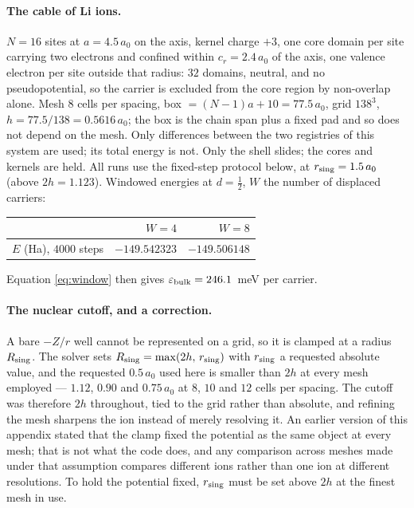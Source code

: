 \documentclass[11pt]{article}
\newcommand{\half}{\tfrac12}
\begin{document}
\paragraph{The cable of Li ions.} $N=16$ sites at $a=4.5\,a_0$ on the
axis, kernel charge $+3$, one core domain per site carrying two electrons and confined within
$c_r=2.4\,a_0$ of the axis, one valence electron per site outside that radius: $32$ domains, neutral,
and no pseudopotential, so the carrier is excluded from the core region by non-overlap alone. Mesh $8$ cells per spacing, box $=(N-1)a+10=77.5\,a_0$, grid $138^3$,
$h=77.5/138=0.5616\,a_0$; the box is the chain span plus a fixed pad and so does not depend on the
mesh. Only differences between the two registries of this system are used; its total energy is not.
Only the shell slides; the cores and kernels are held. All runs use the fixed-step protocol below,
at $r_{\rm sing}=1.5\,a_0$ (above $2h=1.123$). Windowed energies at $d=\half$, $W$ the number of
displaced carriers:
\begin{center}
\small
\begin{tabular}{@{}lrr@{}}
\toprule
 & $W=4$ & $W=8$\\
\midrule
$E$ (Ha), $4000$ steps & $-149.542323$ & $-149.506148$\\
\bottomrule
\end{tabular}
\end{center}
\noindent Equation \eqref{eq:window} then gives $\varepsilon_{\rm bulk}=246.1$~meV per carrier.

\paragraph{The nuclear cutoff, and a correction.} A bare $-Z/r$ well cannot be represented on a
grid, so it is clamped at a radius $R_{\rm sing}$. The solver sets
$R_{\rm sing}=\max(2h,\,r_{\rm sing})$ with $r_{\rm sing}$ a requested absolute value, and the
requested $0.5\,a_0$ used here is smaller than $2h$ at every mesh employed --- $1.12$, $0.90$ and
$0.75\,a_0$ at $8$, $10$ and $12$ cells per spacing. The cutoff was therefore $2h$ throughout, tied
to the grid rather than absolute, and refining the mesh sharpens the ion instead of merely resolving
it. An earlier version of this appendix stated that the clamp fixed the potential as the same object
at every mesh; that is not what the code does, and any comparison across meshes made under that
assumption compares different ions rather than one ion at different resolutions. To hold the
potential fixed, $r_{\rm sing}$ must be set above $2h$ at the finest mesh in use.
\end{document}
